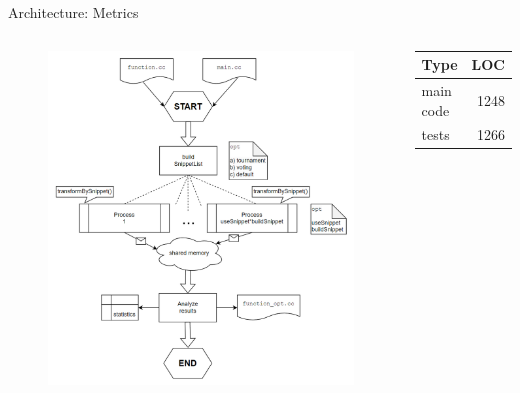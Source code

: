 \documentclass{beamer}
\begin{document}
\begin{frame}{Architecture: Metrics}
    \vspace{-1.2cm}
    \begin{columns}
        \begin{figure}
            \centering
            \includegraphics[height=0.8\textheight]{images/architecture.png} 
        \end{figure}
        \begin{tcolorbox}[width=\linewidth, colframe=CornflowerBlue]
            \centering
            \begin{tabular}{@{}lr@{}}
                \toprule
                \textbf{Type} & \textbf{LOC} \\
                \midrule
                main code & 1248 \\
                tests & 1266 \\
                \bottomrule
            \end{tabular}
        \end{tcolorbox}
    \end{columns}
\end{frame}
\end{document}
